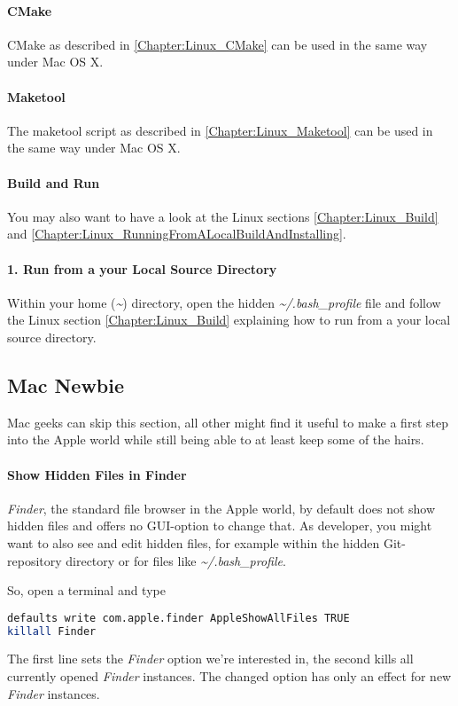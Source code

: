 \paragraph{CMake}
CMake as described in \ref{Chapter:Linux_CMake} can be used in the same way under Mac OS X.


\paragraph{Maketool}
The maketool script as described in \ref{Chapter:Linux_Maketool} can be used in the same way under Mac OS X.


\paragraph{Build and Run}
You may also want to have a look at the Linux sections \ref{Chapter:Linux_Build} and \ref{Chapter:Linux_RunningFromALocalBuildAndInstalling}.


\paragraph{1. Run from a your Local Source Directory}
Within your home (\emph{\textasciitilde}) directory, open the hidden \emph{\textasciitilde /.bash\_profile} file and follow the Linux section \ref{Chapter:Linux_Build} explaining how to run from a your local source directory.



\subsection{Mac Newbie}
Mac geeks can skip this section, all other might find it useful to make a first step into the Apple world while still being able to at least keep some of the hairs.


\paragraph{Show Hidden Files in Finder}
\emph{Finder}, the standard file browser in the Apple world, by default does not show hidden files and offers no \ac{GUI}-option to change that. As developer, you might want to also see and edit hidden files, for example within the hidden Git-repository directory or for files like \emph{\textasciitilde /.bash\_profile}.

So, open a terminal and type
\begin{lstlisting}[language=sh]
defaults write com.apple.finder AppleShowAllFiles TRUE
killall Finder
\end{lstlisting}
The first line sets the \emph{Finder} option we're interested in, the second kills all currently opened \emph{Finder} instances. The changed option has only an effect for new \emph{Finder} instances.
 

